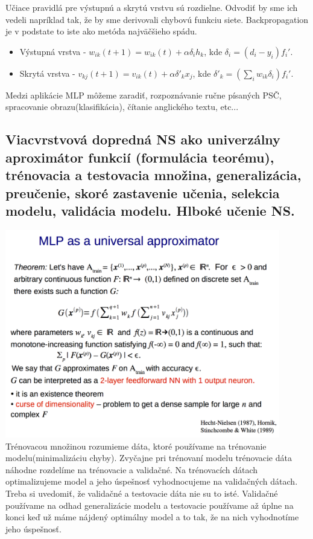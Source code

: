\documentclass{article}
\numberwithin{equation}{section} %
\begin{document}
Učiace pravidlá pre výstupnú a skrytú vrstvu sú rozdielne. Odvodiť by sme ich vedeli napríklad tak, že by sme derivovali chybovú funkciu siete. Backpropagation je v podstate to iste ako metóda najväčšieho spádu.
\begin{itemize}
\item Výstupná vrstva - $ w_{ik}(t+1) = w_{ik}(t) + \alpha\delta_ih_k $, kde $\delta_i = (d_i - y_i)f_i'$.
\item Skrytá vrstva - $ v_{kj}(t+1) = v_{ik}(t) + \alpha\delta'_kx_j $, kde $\delta'_k = (\sum_iw_{ik}\delta_i)f_i'$.
\end{itemize}
Medzi aplikácie MLP môžeme zaradiť, rozpoznávanie ručne písaných PSČ, spracovanie obrazu(klasifikácia), čítanie anglického textu, etc...

\subsection{Viacvrstvová dopredná NS ako univerzálny aproximátor funkcií (formulácia teorému), trénovacia a testovacia množina, generalizácia, preučenie, skoré zastavenie učenia, selekcia modelu, validácia modelu. Hlboké učenie NS.}
\includegraphics[width=12cm]{imgs/uni_aprox}\\
Trénovacou množinou rozumieme dáta, ktoré používame na trénovanie modelu(minimalizáciu chyby). Zvyčajne pri trénovaní modelu trénovacie dáta náhodne rozdelíme na trénovacie a validačné. Na trénovacích dátach optimalizujeme model a jeho úspešnosť vyhodnocujeme na validačných dátach. Treba si uvedomiť, že validačné a testovacie dáta nie su to isté. Validačné používame na odhad generalizácie modelu a testovacie používame až úplne na konci keď už máme nájdený optimálny model a to tak, že na nich vyhodnotíme jeho úspešnosť.
\end{document}
